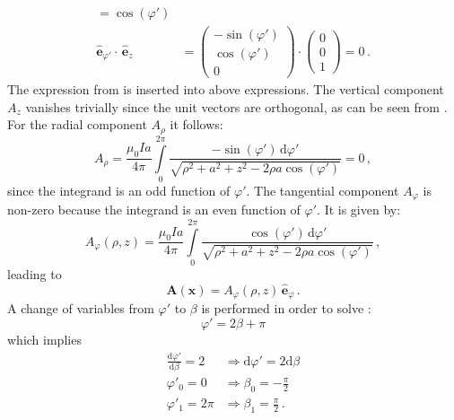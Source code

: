 \begin{align}
                                                                =  \cos(\varphi') \\
  \hat{\mathbf{e}}_{\varphi'} \cdot \,\hat{\mathbf{e}}_z       &= \begin{pmatrix} -\sin(\varphi') \\ \cos(\varphi') \\ 0 \end{pmatrix}
                                                                  \cdot
                                                                  \begin{pmatrix} 0 \\ 0 \\ 1 \end{pmatrix}
                                                                = 0 \, . \label{eqn:e_phiprime_dot_ez}
\end{align}
The expression from  is inserted into above expressions.
The vertical component~$A_z$ vanishes trivially since the unit vectors are orthogonal,
as can be seen from .
For the radial component $A_\rho$ it follows:
\begin{equation}
  A_\rho = \frac{\mu_0 I a}{4 \pi}
           \int\limits_{0}^{2 \pi}
             \frac{-\sin(\varphi') \,\mathrm{d} \varphi'}{\sqrt{ \rho^2 + a^2 + z^2 - 2 \rho a \cos(\varphi')}} = 0 \, ,
\end{equation}
since the integrand is an odd function of $\varphi'$.
The tangential component $A_\varphi$ is non-zero because the integrand is an even function of $\varphi'$.
It is given by:
\begin{equation}
  A_\varphi(\rho, z) = \frac{\mu_0 I a}{4 \pi}
                       \int\limits_{0}^{2 \pi}
                         \frac{\cos(\varphi') \,\mathrm{d} \varphi'}{\sqrt{ \rho^2 + a^2 + z^2 - 2 \rho a \cos(\varphi')}} \, , \label{eqn:a_phi_general}
\end{equation}
leading to
\begin{equation}
  \mathbf{A}(\mathbf{x}) = A_\varphi(\rho, z) \,\hat{\mathbf{e}}_\varphi \, . \label{eqn:a_cwl_components}
\end{equation}
A change of variables from $\varphi'$ to $\beta$ is performed in order to solve :
\begin{equation}
 \varphi' = 2 \beta + \pi
\end{equation}
which implies
\begin{align}
 \frac{\mathrm{d}\varphi'}{\mathrm{d}\beta} = 2     &\Rightarrow \mathrm{d}\varphi' = 2 \mathrm{d}\beta \\
                                 \varphi'_0 = 0     &\Rightarrow           \beta_0 = - \frac{\pi}{2}   \\
                                 \varphi'_1 = 2 \pi &\Rightarrow           \beta_1 =   \frac{\pi}{2}   \, .
\end{align}
